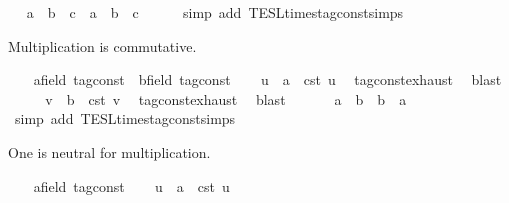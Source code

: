 \begin{isabellebody}
\ \isamarkupfalse%
\ {\isacartoucheopen}a\ {\isacharasterisk}\ b\ {\isacharasterisk}\ c\ {\isacharequal}\ a\ {\isacharasterisk}\ {\isacharparenleft}b\ {\isacharasterisk}\ c{\isacharparenright}{\isacartoucheclose}\isanewline
\ \ \ \ \isamarkupfalse%
\ {\isacharparenleft}simp\ add{\isacharcolon}\ TESL{\isachardot}times{\isacharunderscore}tag{\isacharunderscore}const{\isachardot}simps{\isacharparenright}\isanewline
{}\isamarkupfalse%
%
\begin{isamarkuptext}%
Multiplication is commutative.%
\end{isamarkuptext}\isamarkuptrue%
\ \ \isamarkupfalse%
\ a{\isacharcolon}{\isacharcolon}{\isacartoucheopen}{\isacharprime}{\isasymtau}{\isacharcolon}{\isacharcolon}field\ tag{\isacharunderscore}const{\isacartoucheclose}\ \ b{\isacharcolon}{\isacharcolon}{\isacartoucheopen}{\isacharprime}{\isasymtau}{\isacharcolon}{\isacharcolon}field\ tag{\isacharunderscore}const{\isacartoucheclose}\isanewline
\ \ \isamarkupfalse%
\ u\ \ {\isacartoucheopen}a\ {\isacharequal}\ {\isasymtau}\isactrlsub c\isactrlsub s\isactrlsub t\ u{\isacartoucheclose}\ \isamarkupfalse%
\ tag{\isacharunderscore}const{\isachardot}exhaust\ \isamarkupfalse%
\ blast\isanewline
\ \ \isamarkupfalse%
\ \isamarkupfalse%
\ v\ \ {\isacartoucheopen}b\ {\isacharequal}\ {\isasymtau}\isactrlsub c\isactrlsub s\isactrlsub t\ v{\isacartoucheclose}\ \isamarkupfalse%
\ tag{\isacharunderscore}const{\isachardot}exhaust\ \isamarkupfalse%
\ blast\isanewline
\ \ \isamarkupfalse%
\ \isamarkupfalse%
\ {\isacartoucheopen}\ a\ {\isacharasterisk}\ b\ {\isacharequal}\ b\ {\isacharasterisk}\ a{\isacartoucheclose}\isanewline
\ \ \ \ \isamarkupfalse%
\ {\isacharparenleft}simp\ add{\isacharcolon}\ TESL{\isachardot}times{\isacharunderscore}tag{\isacharunderscore}const{\isachardot}simps{\isacharparenright}\isanewline
{}\isamarkupfalse%
%
\begin{isamarkuptext}%
One is neutral for multiplication.%
\end{isamarkuptext}\isamarkuptrue%
\ \ \isamarkupfalse%
\ a{\isacharcolon}{\isacharcolon}{\isacartoucheopen}{\isacharprime}{\isasymtau}{\isacharcolon}{\isacharcolon}field\ tag{\isacharunderscore}const{\isacartoucheclose}\isanewline
\ \ \isamarkupfalse%
\ u\ \ {\isacartoucheopen}a\ {\isacharequal}\ {\isasymtau}\isactrlsub c\isactrlsub s\isactrlsub t\ u{\isacartoucheclose}\ \isamarkupfalse%

\end{isabellebody}

